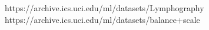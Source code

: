 https://archive.ics.uci.edu/ml/datasets/Lymphography
https://archive.ics.uci.edu/ml/datasets/balance+scale